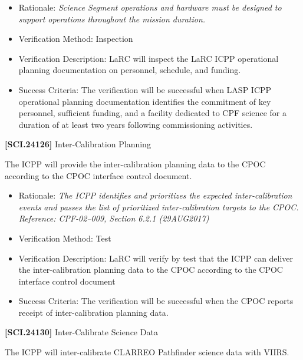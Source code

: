 \documentclass[12pt,oneside,oldfontcommands]{memoir}
\begin{document}
\begin{itemize}
\item{} Rationale: \emph{Science Segment operations and hardware must be designed to support operations throughout the mission duration.}

\item{} Verification Method: Inspection

\item{} Verification Description: \gls{LaRC} will inspect the \gls{LaRC} \gls{ICPP} operational planning documentation on personnel, schedule, and funding.

\item{} Success Criteria: The verification will be successful when \gls{LASP} \gls{ICPP} operational planning documentation identifies the commitment of key personnel, sufficient funding, and a facility dedicated to \gls{CPF} science for a duration of at least two years following commissioning activities.

\end{itemize}

\textbf{[SCI.24126]} Inter-Calibration Planning

The \gls{ICPP} will provide the inter-calibration planning data to the \gls{CPOC} according to the \gls{CPOC} interface control document.

\begin{itemize}
\item{} Rationale: \emph{The ICPP identifies and prioritizes the expected inter-calibration events and passes the list of prioritized inter-calibration targets to the CPOC. Reference: CPF-02--009, Section 6.2.1 (29AUG2017)}

\item{} Verification Method: Test

\item{} Verification Description: \gls{LaRC} will verify by \gls{test} that the \gls{ICPP} can deliver the inter-calibration planning data to the \gls{CPOC} according to the \gls{CPOC} interface control document

\item{} Success Criteria: The verification will be successful when the \gls{CPOC} reports receipt of inter-calibration planning data.

\end{itemize}

\textbf{[SCI.24130]} Inter-Calibrate Science Data

The \gls{ICPP} will inter-calibrate \gls{CLARREO} Pathfinder science data with \gls{VIIRS}.
\end{document}
